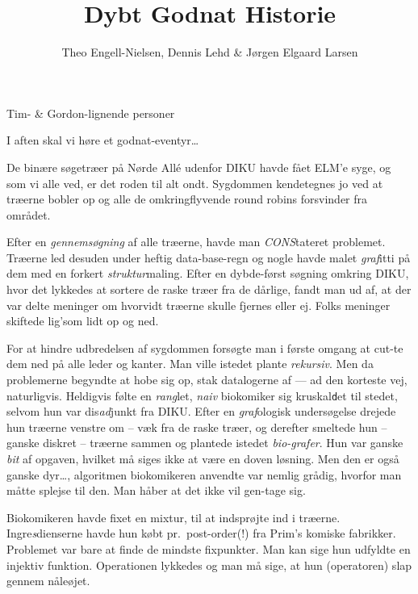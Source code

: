 \documentclass[10pt]{article}
\title{Dybt Godnat Historie}
\author{Theo Engell-Nielsen, Dennis Lehd \& Jørgen Elgaard Larsen}
\begin{document}
\maketitle

\begin{sketch}

\begin{roles}
 Tim- \& Gordon-lignende personer
\end{roles}

 I aften skal vi høre et godnat-eventyr\ldots

 De binære søgetræer på Nørde All\'e udenfor DIKU havde fået
ELM'e syge, og som vi alle ved, er det roden til alt ondt. Sygdommen
kendetegnes jo ved at træerne bobler op og alle de omkringflyvende round
robins forsvinder fra området. 

 Efter en {\em gennemsøgning} af alle træerne, havde man {\em
  CONS}tateret problemet. Træerne led desuden under heftig data-base-regn
og nogle havde malet {\em graf}itti på dem med en forkert {\em
  struktur}maling. Efter en dybde-først søgning omkring DIKU, hvor det
lykkedes at sortere de raske træer fra de dårlige, fandt man ud af, at der
var delte meninger om hvorvidt træerne skulle fjernes eller ej. Folks
meninger skiftede lig'som lidt op og ned.

 For at hindre udbredelsen af sygdommen forsøgte man i første
omgang at cut-te dem ned på alle leder og kanter. Man ville istedet plante
{\em rekursiv}. Men da problemerne begyndte at hobe sig op, stak
datalogerne af --- ad den korteste vej, naturligvis.  Heldigvis følte en
{\em rang}let, {\em naiv} biokomiker sig kruskal{\tt d}et til stedet,
selvom hun var dis{\em ad}junkt fra {\sc DIKU}. Efter en {\em graf}ologisk
undersøgelse drejede hun træerne venstre om -- væk fra de raske træer, og
derefter smeltede hun -- ganske diskret -- træerne sammen og plantede
istedet {\em bio-grafer}.  Hun var ganske {\em bit} af opgaven, hvilket må
siges ikke at være en doven løsning. Men den er også ganske dyr\ldots,
algoritmen biokomikeren anvendte var nemlig grådig, hvorfor man måtte
splejse til den. Man håber at det ikke vil gen-tage sig.

 Biokomikeren havde fixet en mixtur, til at indsprøjte ind i
træerne. Ingre{\em s}dienserne havde hun købt pr.\ post-order(!) fra Prim's
komiske fabrikker. Problemet var bare at finde de mindste fixpunkter. Man
kan sige hun udfyldte en injektiv funktion. Operationen lykkedes og man må
sige, at hun (operatoren) slap gennem nåleøjet.


\end{sketch}
\end{document}

